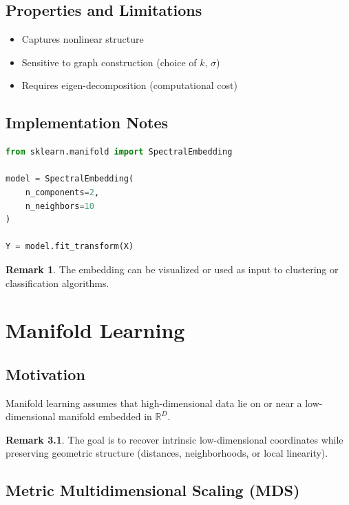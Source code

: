 \documentclass[12pt,oneside]{book}
\numberwithin{equation}{section}
\theoremstyle{definition}
\newtheorem{remark}{Remark}[section]
\theoremstyle{plain}
\theoremstyle{remark}
\newcommand{\R}{\mathbb{R}}
\begin{document}
\section{Properties and Limitations}

\begin{itemize}
    \item Captures nonlinear structure
    \item Sensitive to graph construction (choice of $k$, $\sigma$)
    \item Requires eigen-decomposition (computational cost)
\end{itemize}

\section{Implementation Notes}

\begin{lstlisting}[language=Python]
from sklearn.manifold import SpectralEmbedding

model = SpectralEmbedding(
    n_components=2,
    n_neighbors=10
)

Y = model.fit_transform(X)
\end{lstlisting}

\begin{remark}
The embedding can be visualized or used as input to clustering or classification algorithms.
\end{remark}

\chapter{Manifold Learning}

\section{Motivation}

Manifold learning assumes that high-dimensional data lie on or near a low-dimensional manifold embedded in $\R^D$.

\begin{remark}
The goal is to recover intrinsic low-dimensional coordinates while preserving geometric structure (distances, neighborhoods, or local linearity).
\end{remark}

\section{Metric Multidimensional Scaling (MDS)}
\end{document}
